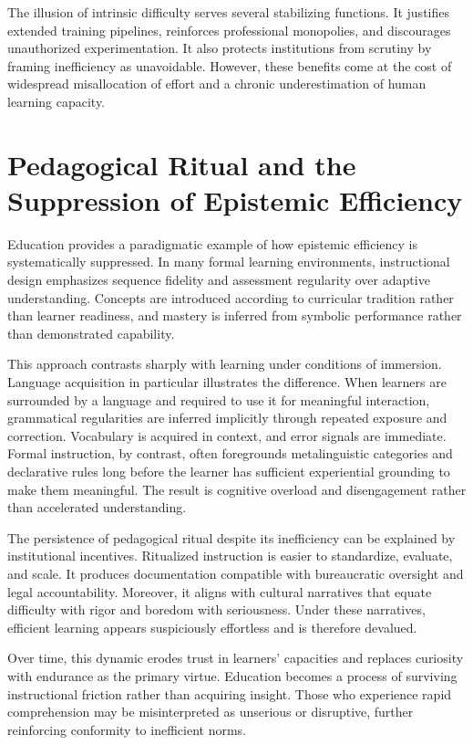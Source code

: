 \documentclass[12pt]{article}
\begin{document}
The illusion of intrinsic difficulty serves several stabilizing functions. It justifies extended training pipelines, reinforces professional monopolies, and discourages unauthorized experimentation. It also protects institutions from scrutiny by framing inefficiency as unavoidable. However, these benefits come at the cost of widespread misallocation of effort and a chronic underestimation of human learning capacity.

\section{Pedagogical Ritual and the Suppression of Epistemic Efficiency}

Education provides a paradigmatic example of how epistemic efficiency is systematically suppressed. In many formal learning environments, instructional design emphasizes sequence fidelity and assessment regularity over adaptive understanding. Concepts are introduced according to curricular tradition rather than learner readiness, and mastery is inferred from symbolic performance rather than demonstrated capability.

This approach contrasts sharply with learning under conditions of immersion. Language acquisition in particular illustrates the difference. When learners are surrounded by a language and required to use it for meaningful interaction, grammatical regularities are inferred implicitly through repeated exposure and correction. Vocabulary is acquired in context, and error signals are immediate. Formal instruction, by contrast, often foregrounds metalinguistic categories and declarative rules long before the learner has sufficient experiential grounding to make them meaningful. The result is cognitive overload and disengagement rather than accelerated understanding.

The persistence of pedagogical ritual despite its inefficiency can be explained by institutional incentives. Ritualized instruction is easier to standardize, evaluate, and scale. It produces documentation compatible with bureaucratic oversight and legal accountability. Moreover, it aligns with cultural narratives that equate difficulty with rigor and boredom with seriousness. Under these narratives, efficient learning appears suspiciously effortless and is therefore devalued.

Over time, this dynamic erodes trust in learners' capacities and replaces curiosity with endurance as the primary virtue. Education becomes a process of surviving instructional friction rather than acquiring insight. Those who experience rapid comprehension may be misinterpreted as unserious or disruptive, further reinforcing conformity to inefficient norms.
\end{document}
